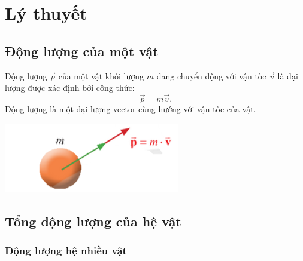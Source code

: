 \setcounter{section}{0}
\section{Lý thuyết}
\subsection{Động lượng của một vật}
\begin{minipage}{0.6\textwidth}
	Động lượng $\vec{p}$ của một vật khối lượng $m$ đang chuyển động với vận tốc $\vec{v}$ là đại lượng được xác định bởi công thức:
	\begin{equation*}
		\vec{p}=m\vec{v}.
	\end{equation*}
	Động lượng là một đại lượng vector cùng hướng với vận tốc của vật.
\end{minipage}
\begin{minipage}{0.4\textwidth}
	\begin{center}
		\includegraphics[scale=0.7]{../figs/G10-023-1}
	\end{center}
\end{minipage}

\subsection{Tổng động lượng của hệ vật}
\subsubsection{Động lượng hệ nhiều vật}

